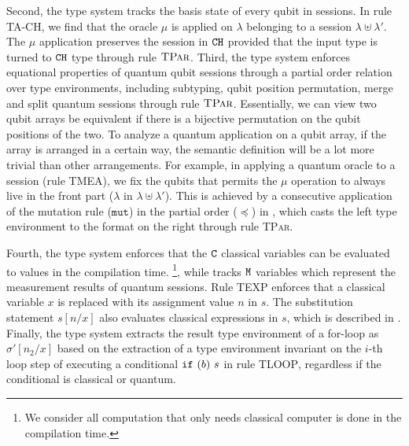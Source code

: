 Second, the type system tracks the basis state of every qubit in sessions. In rule \textsc{TA-CH}, we find that the oracle $\mu$ is applied on $\lambda$ belonging to a session $\lambda \uplus \lambda'$. The $\mu$ application preserves the session in $\texttt{CH}$ provided that the input type is turned to $\texttt{CH}$ type through rule $\textsc{TPar}$.
Third, the type system enforces equational properties of 
quantum qubit sessions through a partial order relation over type environments, including subtyping, qubit position permutation, merge and split quantum sessions through rule $\textsc{TPar}$.
Essentially, we can view two qubit arrays be equivalent if there is a bijective permutation on the qubit positions of the two.
To analyze a quantum application on a qubit array, if the array is arranged in a certain way, the semantic definition will be a lot more trivial than other arrangements. For example, in applying a quantum oracle to a session (rule \textsc{TMEA}), we fix the qubits that permits the $\mu$ operation to always live in the front part ($\lambda$ in $\lambda\uplus\lambda'$).
This is achieved by a consecutive application of the mutation rule ($\texttt{mut}$) in the partial order ($\preceq$) in , which casts the left type environment to the format on the right through rule \textsc{TPar}.

Fourth, the type system enforces that the $\texttt{C}$ classical variables can be evaluated to values in the compilation time. \footnote{We consider all computation that only needs classical computer is done in the compilation time.}, while tracks $\texttt{M}$ variables which represent the measurement results of quantum sessions. Rule \textsc{TEXP} enforces that a classical variable $x$ is replaced with its assignment value $n$ in $s$. The substitution statement $s[n/x]$ also evaluates classical expressions in $s$, which is described in .
Finally, the type system extracts the result type environment of a for-loop as $\sigma'[n_2/x]$ based on the extraction of a type environment invariant on the $i$-th loop step of executing a conditional $\texttt{if}~{(b)}~{s}$ in rule \textsc{TLOOP}, regardless if the conditional is classical or quantum. 

